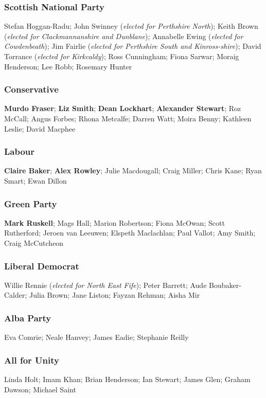 \begin{resultsiii}
\subsubsection*{Scottish National Party}
Stefan Hoggan-Radu; John Swinney (\emph{elected for Perthshire North}); Keith Brown (\emph{elected for Clackmannanshire and Dunblane}); Annabelle Ewing (\emph{elected for Cowdenbeath}); Jim Fairlie (\emph{elected for Perthshire South and Kinross-shire}); David Torrance (\emph{elected for Kirkcaldy}); Ross Cunningham; Fiona Sarwar; Moraig Henderson; Lee Robb; Rosemary Hunter

\subsubsection*{Conservative}
\textbf{Murdo Fraser}; \textbf{Liz Smith}; \textbf{Dean Lockhart}; \textbf{Alexander Stewart}; Roz McCall; Angus Forbes; Rhona Metcalfe; Darren Watt; Moira Benny; Kathleen Leslie; David Macphee

\subsubsection*{Labour}
\textbf{Claire Baker}; \textbf{Alex Rowley}; Julie Macdougall; Craig Miller; Chris Kane; Ryan Smart; Ewan Dillon

\subsubsection*{Green Party}
\textbf{Mark Ruskell}; Mags Hall; Marion Robertson; Fiona McOwan; Scott Rutherford; Jeroen van Leeuwen; Elspeth Maclachlan; Paul Vallot; Amy Smith; Craig McCutcheon

\subsubsection*{Liberal Democrat}
Willie Rennie (\emph{elected for North East Fife}); Peter Barrett; Aude Boubaker-Calder; Julia Brown; Jane Liston; Fayzan Rehman; Aisha Mir

\subsubsection*{Alba Party}
Eva Comrie; Neale Hanvey; James Eadie; Stephanie Reilly

\subsubsection*{All for Unity}
Linda Holt; Imam Khan; Brian Henderson; Ian Stewart; James Glen; Graham Dawson; Michael Saint


\end{resultsiii}
